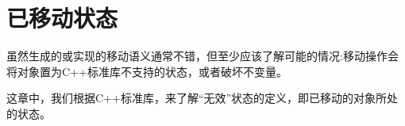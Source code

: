 \chapter{已移动状态}
虽然生成的或实现的移动语义通常不错，但至少应该了解可能的情况:移动操作会将对象置为C++标准库不支持的状态，或者破坏不变量。

这章中，我们根据C++标准库，来了解“无效”状态的定义，即已移动的对象所处的状态。



